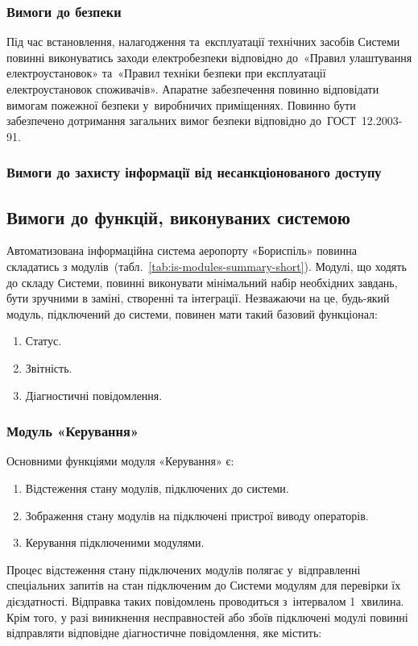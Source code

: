 \documentclass[
	a4paper,
	oneside,
	BCOR = 10mm,
	DIV = 12,
	12pt,
	headings = normal,
]{scrartcl}
\begin{document}
			\subsubsection{Вимоги до безпеки}
				Під час встановлення, налагодження та~експлуатації технічних засобів Системи повинні виконуватись заходи електробезпеки відповідно до~«Правил улаштування електроустановок» та~«Правил техніки безпеки при експлуатації електроустановок споживачів». Апаратне забезпечення повинно відповідати вимогам пожежної безпеки у~виробничих приміщеннях. Повинно бути забезпечено дотримання загальних вимог безпеки відповідно до~ГОСТ~12.2003-91.

			\subsubsection{Вимоги до захисту інформації від несанкціонованого доступу}

		\subsection{Вимоги до функцій, виконуваних системою}
			Автоматизована інформаційна система аеропорту «Бориспіль» повинна складатись з модулів~(табл.~\ref{tab:is-modules-summary-short}). Модулі, що ходять до складу Системи, повинні виконувати мінімальний набір необхідних завдань, бути зручними в заміні, створенні та інтеграції. Незважаючи на це, будь-який модуль, підключений до системи, повинен мати такий базовий функціонал:
			\begin{enumerate}[noitemsep]
				\item Статус.
				\item Звітність.
				\item Діагностичні повідомлення.
			\end{enumerate}

			\subsubsection{Модуль «Керування»}
				Основними функціями модуля «Керування» є:
				\begin{enumerate}[noitemsep]
					\item Відстеження стану модулів, підключених до системи.
					\item Зображення стану модулів на підключені пристрої виводу операторів. 
					\item Керування підключеними модулями.
				\end{enumerate}
						Процес відстеження стану підключених модулів полягає у~відправленні спеціальних запитів на стан підключеним до Системи модулям для перевірки їх дієздатності. Відправка таких повідомлень проводиться з~інтервалом 1~хвилина. Крім того, у разі виникнення несправностей або збоїв підключені модулі повинні відправляти відповідне діагностичне повідомлення, яке містить:
\end{document}
